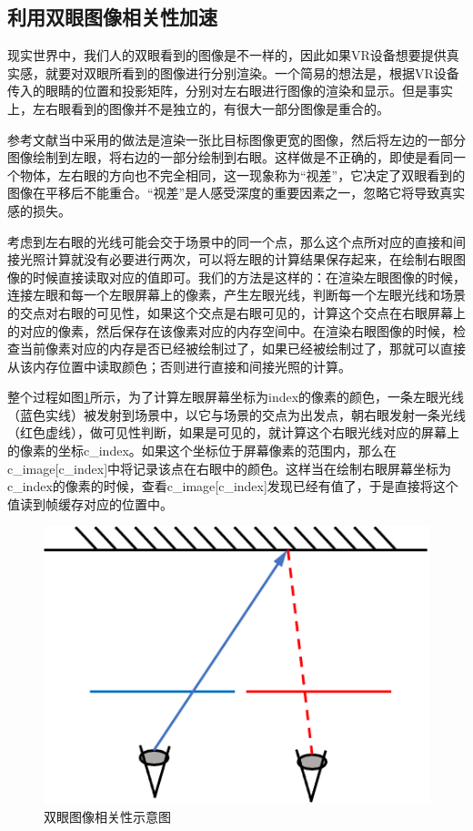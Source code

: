 \documentclass[UTF8]{ctexart}
\begin{document}
    \subsection{利用双眼图像相关性加速}
    现实世界中，我们人的双眼看到的图像是不一样的，因此如果VR设备想要提供真实感，就要对双眼所看到的图像进行分别渲染。一个简易的想法是，根据VR设备传入的眼睛的位置和投影矩阵，分别对左右眼进行图像的渲染和显示。但是事实上，左右眼看到的图像并不是独立的，有很大一部分图像是重合的。
    
    参考文献\cite{fujita2014foveated}当中采用的做法是渲染一张比目标图像更宽的图像，然后将左边的一部分图像绘制到左眼，将右边的一部分绘制到右眼。这样做是不正确的，即使是看同一个物体，左右眼的方向也不完全相同，这一现象称为“视差”，它决定了双眼看到的图像在平移后不能重合。“视差”是人感受深度的重要因素之一，忽略它将导致真实感的损失。
    
    考虑到左右眼的光线可能会交于场景中的同一个点，那么这个点所对应的直接和间接光照计算就没有必要进行两次，可以将左眼的计算结果保存起来，在绘制右眼图像的时候直接读取对应的值即可。我们的方法是这样的：在渲染左眼图像的时候，连接左眼和每一个左眼屏幕上的像素，产生左眼光线，判断每一个左眼光线和场景的交点对右眼的可见性，如果这个交点是右眼可见的，计算这个交点在右眼屏幕上的对应的像素，然后保存在该像素对应的内存空间中。在渲染右眼图像的时候，检查当前像素对应的内存是否已经被绘制过了，如果已经被绘制过了，那就可以直接从该内存位置中读取颜色；否则进行直接和间接光照的计算。
    
    整个过程如图\ref{fig:3}所示，为了计算左眼屏幕坐标为index的像素的颜色，一条左眼光线（蓝色实线）被发射到场景中，以它与场景的交点为出发点，朝右眼发射一条光线（红色虚线），做可见性判断，如果是可见的，就计算这个右眼光线对应的屏幕上的像素的坐标c\_index。如果这个坐标位于屏幕像素的范围内，那么在c\_image[c\_index]中将记录该点在右眼中的颜色。这样当在绘制右眼屏幕坐标为c\_index的像素的时候，查看c\_image[c\_index]发现已经有值了，于是直接将这个值读到帧缓存对应的位置中。
    
    \begin{figure}[htbp]
    \centering
    \includegraphics[scale=0.6]{pic/BinocularCorrelation.png}
    \caption{双眼图像相关性示意图}
    \label{fig:3}
    \end{figure}
    
\end{document}
